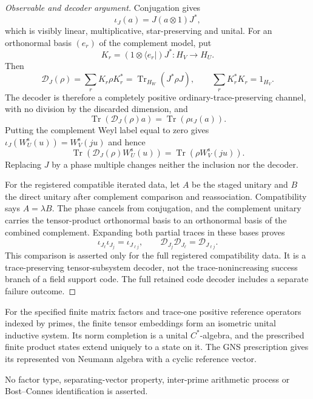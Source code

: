 \begin{proof}[Observable and decoder argument]
Conjugation gives
\[
 \iota_J(a)=J(a\otimes1)J^*,
\]
which is visibly linear, multiplicative, star-preserving and unital. For an
orthonormal basis $(e_r)$ of the complement model, put
\[
 K_r=(1\otimes\langle e_r|)J^*:H_V\to H_U.
\]
Then
\[
 \mathcal D_J(\rho)=\sum_rK_r\rho K_r^*
 =\operatorname{Tr}_{H_W}(J^*\rho J),
 \qquad \sum_rK_r^*K_r=1_{H_V}.
\]
The decoder is therefore a completely positive ordinary-trace-preserving
channel, with no division by the discarded dimension, and
\[
 \operatorname{Tr}(\mathcal D_J(\rho)a)
 =\operatorname{Tr}(\rho\iota_J(a)).
\]
Putting the complement Weyl label equal to zero gives
$\iota_J(W_U^{\mathrm s}(u))=W_V^{\mathrm s}(ju)$ and hence
\[
 \operatorname{Tr}(\mathcal D_J(\rho)W_U^{\mathrm s}(u))
 =\operatorname{Tr}(\rho W_V^{\mathrm s}(ju)).
\]
Replacing $J$ by a phase multiple changes neither the inclusion nor the
decoder.

For the registered compatible iterated data, let $A$ be the staged unitary
and $B$ the direct unitary after complement comparison and reassociation.
Compatibility says $A=\lambda B$. The phase cancels from conjugation, and
the complement unitary carries the tensor-product orthonormal basis to an
orthonormal basis of the combined complement. Expanding both partial traces
in these bases proves
\[
 \iota_{J_\ell}\iota_{J_j}=\iota_{J_{\ell j}},
 \qquad
 \mathcal D_{J_j}\mathcal D_{J_\ell}=\mathcal D_{J_{\ell j}}.
\]
This comparison is asserted only for the full registered compatibility data.
It is a trace-preserving tensor-subsystem decoder, not the trace-nonincreasing
success branch of a field support code. The full retained code decoder
includes a separate failure outcome.
\end{proof}

\begin{proposition}
\statusProved{}
For the specified finite matrix factors and trace-one positive reference operators
indexed by primes, the finite tensor embeddings form an isometric unital inductive
system. Its norm completion is a unital $C^*$-algebra, and the prescribed finite
product states extend uniquely to a state on it. The GNS prescription gives its
represented von Neumann algebra with a cyclic reference vector.
\end{proposition}
\begin{scope}
No factor type, separating-vector property, inter-prime arithmetic process or Bost--Connes identification is asserted.
\end{scope}

